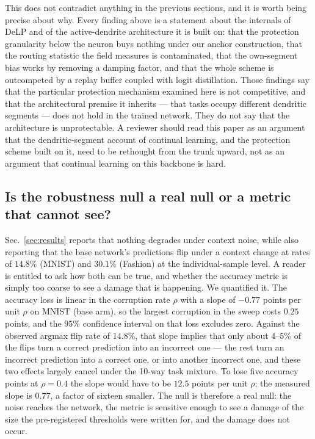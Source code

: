 \documentclass[review,12pt,number]{elsarticle}
\begin{document}
This does not contradict anything in the previous sections, and it is
worth being precise about why. Every finding above is a statement about
the internals of DeLP and of the active-dendrite architecture it is built
on: that the protection granularity below the neuron buys nothing under
our anchor construction, that the routing statistic the field measures
is contaminated, that the own-segment bias works by removing a damping
factor, and that the whole scheme is outcompeted by a replay buffer
coupled with logit distillation. Those findings say that the particular
protection mechanism examined here is not competitive, and that the
architectural premise it inherits --- that tasks occupy different
dendritic segments --- does not hold in the trained network. They do not
say that the architecture is unprotectable. A reviewer should read this
paper as an argument that the dendritic-segment account of continual
learning, and the protection scheme built on it, need to be rethought
from the trunk upward, not as an argument that continual learning on this
backbone is hard.

\subsection{Is the robustness null a real null or a metric that cannot
see?}
\label{sec:ctrl-metric}

Sec.~\ref{sec:results} reports that nothing degrades under context
noise, while also reporting that the base network's predictions flip
under a context change at rates of $14.8\%$ (MNIST) and $30.1\%$ (Fashion)
at the individual-sample level. A reader is entitled to ask how both can
be true, and whether the accuracy metric is simply too coarse to see a
damage that is happening. We quantified it. The accuracy loss is linear
in the corruption rate $\rho$ with a slope of $-0.77$ points per unit
$\rho$ on MNIST (base arm), so the largest corruption in the sweep costs
$0.25$ points, and the $95\%$ confidence interval on that loss excludes
zero. Against the observed argmax flip rate of $14.8\%$, that slope
implies that only about $4$--$5\%$ of the flips turn a correct prediction
into an incorrect one --- the rest turn an incorrect prediction into a
correct one, or into another incorrect one, and these two effects
largely cancel under the 10-way task mixture. To lose five accuracy
points at $\rho=0.4$ the slope would have to be $12.5$ points per unit
$\rho$; the measured slope is $0.77$, a factor of sixteen smaller. The
null is therefore a real null: the noise reaches the network, the metric
is sensitive enough to see a damage of the size the pre-registered
thresholds were written for, and the damage does not occur.
\end{document}

